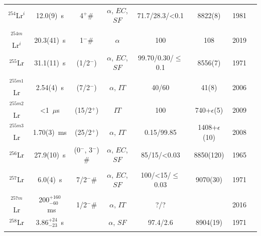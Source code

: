 \begin{center}
\begin{longtable}{c|ccccccl}
$^{254}$Lr$^i$& 12.0(9)~s	& 4$^+ \#$	&$\alpha$, $EC$, $SF$&71.7/28.3/<0.1& 8822(8)		&1981	&{\tiny\cite{Muenzenberg1981,Oganessian1984,Hessberger1985,Muenzenberg1989,Holden2000,Gan2001}}\\
			&				&			&					&			& 				    &		&{\tiny\cite{Folden2006,Antalic2008,Gates2008a,Hessberger2009,Ito2018,Vostinar2019}}\\
$^{254m}$Lr$^i$& 20.3(41)~s & 1$^-\#$ 	&$\alpha$			&100		& 108			    &2019	&{\tiny\cite{Vostinar2019}}\\
$^{255}$Lr	& 31.1(11)~s	& (1/2$^-$)	&$\alpha$, $EC$, $SF$&99.70/0.30/$\leq$0.1& 8556(7)	&1971	&{\tiny\cite{Druin1971a,EskolaK1971,Bemis1976,Oganessian1976,Holden2000,Gan2001}}\\
			&				&			&					&			& 				    &		&{\tiny\cite{Hessberger2004a,Antalic2008,Antalic2015}}\\
$^{255m1}$Lr& 2.54(4)~s		&  (7/2$^-$)&$\alpha$, $IT$	    &40/60		& 41(8) 			&2006	&{\tiny\cite{Chatillon2006,Hauschild2008,Antalic2008,Jeppesen2009a,Ketelhut2009,Antalic2015}}\\
$^{255m2}$Lr& <1~$\mu$s		&  (15/2$^+$)&$IT$				&100		& 740+$\epsilon$(5) &2009	&{\tiny\cite{Jeppesen2009a}}\\
$^{255m3}$Lr& 1.70(3)~ms    &  (25/2$^+$)	&$\alpha$, $IT$	&0.15/99.85	& 1408+$\epsilon$(10)&2008	&{\tiny\cite{Hauschild2008,Antalic2008,Jeppesen2009a,Ketelhut2009}}\\
$^{256}$Lr	& 27.9(10)~s	& (0$^-$, 3$^-$) \#	&$\alpha$, $EC$, $SF$&85/15/<0.03& 8850(120)&1965	&{\tiny\cite{Donets1965,Flerov1967b,EskolaK1971,Bemis1976,Antalic2008,Asai2010}}\\
			&				&			&					&			& 				    &		&{\tiny\cite{Minaya-Ramirez2012, Sato2014}}\\
$^{257}$Lr	& 6.0(4)~s		& 7/2$^- \#$&$\alpha$, $EC$, $SF$	&100/<15/$\leq$0.03& 9070(30)&1971	&{\tiny\cite{Flerov1970,EskolaK1971,Flerov1971,Bemis1976,Hessberger1997,Holden2000}}\\
			&				&			&					&			& 				    &		&{\tiny\cite{Gan2004,Qian2009,Hessberger2016,Hessberger2016b}}\\
$^{257m}$Lr	& 200$^{+160}_{-60}$~ms& 1/2$^- \#$&$\alpha$, $IT$&?/?      & 	                &2016   &{\tiny\cite{Hessberger2016,Hessberger2016b}}\\
$^{258}$Lr	& 3.86$^{+24}_{-23}$~s& 		&$\alpha$, $SF$		&97.4/2.6		& 8904(19)	&1971	&{\tiny\cite{EskolaK1971,Flerov1971,Bemis1976,Bemis1977b,Gregorich1992,Schaedel1992}}\\
			&				&			&					&			& 				    &		&{\tiny\cite{Morita2009,Morita2012,Haba2014,Haba2020}}\\

\end{longtable}
\end{center}
